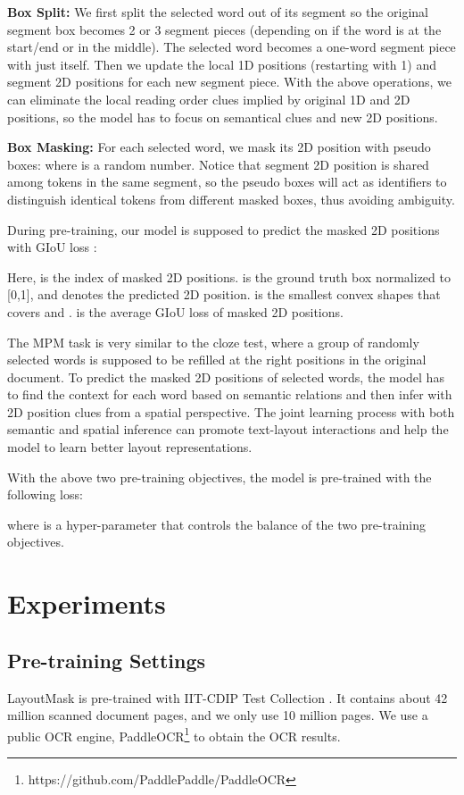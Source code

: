 \documentclass[11pt]{article}
\begin{document}
\noindent\textbf{Box Split:}
We first split the selected word out of its segment so the original segment box becomes 2 or 3 segment
pieces (depending on if the word is at the start/end or in the middle).
The selected word becomes a one-word segment piece with just itself.
Then we update the local 1D positions (restarting with 1) and segment 2D positions for each new segment piece.
With the above operations, we can eliminate the local reading order clues implied by original 1D and 2D positions, so the model has to focus on semantical clues and new 2D positions.

\noindent\textbf{Box Masking:}
For each selected word, we mask its 2D position with pseudo boxes:  where  is a random number.
Notice that segment 2D position is shared among tokens in the same segment, so the pseudo boxes will act as identifiers to distinguish identical tokens from different masked boxes, thus avoiding ambiguity.  

During pre-training, our model is supposed to predict the masked 2D positions with GIoU loss \citep{rezatofighi2019generalized}:




Here,  is the index of  masked 2D positions.
 is the ground truth box normalized to [0,1], and  denotes the predicted 2D position.
 is the smallest convex shapes that covers  and .  is the average GIoU loss of  masked 2D positions.


The MPM task is very similar to the cloze test, where a group of randomly selected words is supposed to be refilled at the right positions in the original document. 
To predict the masked 2D positions of selected words, the model has to find the context for each word based on semantic relations and then infer with 2D position clues from a spatial perspective. The joint learning process with both semantic and spatial inference can promote text-layout interactions and help the model to learn better layout representations.


With the above two pre-training objectives, the model is pre-trained with the following loss:

where  is a hyper-parameter that controls the balance of the two pre-training objectives. 



\section{Experiments}

\subsection{Pre-training Settings}
LayoutMask is pre-trained with IIT-CDIP Test Collection \citep{IIT-CDIP-lewis2006building}.
It contains about 42 million scanned document pages, and we only use 10 million pages. 
We use a public OCR engine, PaddleOCR\footnote{https://github.com/PaddlePaddle/PaddleOCR} to obtain the OCR results.  
\end{document}
